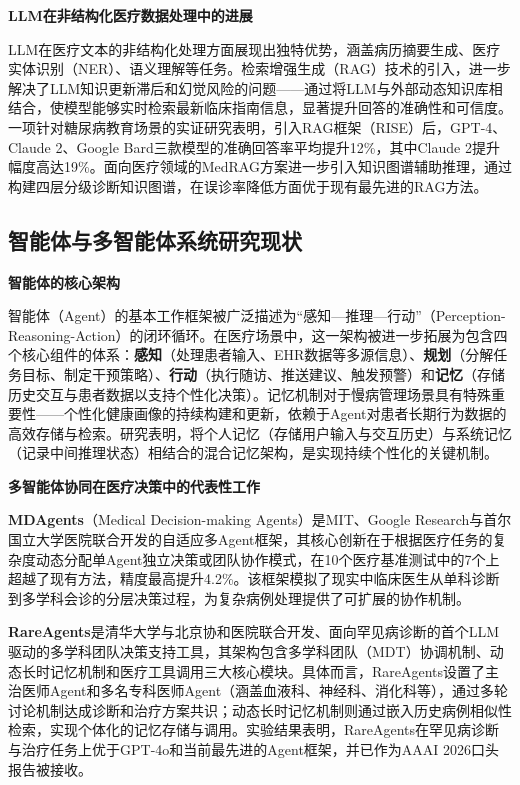 \noindent\textbf{LLM在非结构化医疗数据处理中的进展}

LLM在医疗文本的非结构化处理方面展现出独特优势，涵盖病历摘要生成、医疗实体识别（NER）、语义理解等任务。检索增强生成（RAG）技术的引入，进一步解决了LLM知识更新滞后和幻觉风险的问题------通过将LLM与外部动态知识库相结合，使模型能够实时检索最新临床指南信息，显著提升回答的准确性和可信度。一项针对糖尿病教育场景的实证研究表明，引入RAG框架（RISE）后，GPT-4、Claude 2、Google Bard三款模型的准确回答率平均提升12\%，其中Claude 2提升幅度高达19\%。面向医疗领域的MedRAG方案进一步引入知识图谱辅助推理，通过构建四层分级诊断知识图谱，在误诊率降低方面优于现有最先进的RAG方法\todocite{}\todocite{}\todocite{}。

\subsection{智能体与多智能体系统研究现状}

\noindent\textbf{智能体的核心架构}

智能体（Agent）的基本工作框架被广泛描述为``感知---推理---行动''（Perception-Reasoning-Action）的闭环循环。在医疗场景中，这一架构被进一步拓展为包含四个核心组件的体系：\textbf{感知}（处理患者输入、EHR数据等多源信息）、\textbf{规划}（分解任务目标、制定干预策略）、\textbf{行动}（执行随访、推送建议、触发预警）和\textbf{记忆}（存储历史交互与患者数据以支持个性化决策）。记忆机制对于慢病管理场景具有特殊重要性------个性化健康画像的持续构建和更新，依赖于Agent对患者长期行为数据的高效存储与检索。研究表明，将个人记忆（存储用户输入与交互历史）与系统记忆（记录中间推理状态）相结合的混合记忆架构，是实现持续个性化的关键机制\todocite{}\todocite{}\todocite{}\todocite{}。

\noindent\textbf{多智能体协同在医疗决策中的代表性工作}

\textbf{MDAgents}（Medical Decision-making Agents）是MIT、Google Research与首尔国立大学医院联合开发的自适应多Agent框架，其核心创新在于根据医疗任务的复杂度动态分配单Agent独立决策或团队协作模式，在10个医疗基准测试中的7个上超越了现有方法，精度最高提升4.2\%。该框架模拟了现实中临床医生从单科诊断到多学科会诊的分层决策过程，为复杂病例处理提供了可扩展的协作机制\todocite{}\todocite{}。

\textbf{RareAgents}是清华大学与北京协和医院联合开发、面向罕见病诊断的首个LLM驱动的多学科团队决策支持工具，其架构包含多学科团队（MDT）协调机制、动态长时记忆机制和医疗工具调用三大核心模块。具体而言，RareAgents设置了主治医师Agent和多名专科医师Agent（涵盖血液科、神经科、消化科等），通过多轮讨论机制达成诊断和治疗方案共识；动态长时记忆机制则通过嵌入历史病例相似性检索，实现个体化的记忆存储与调用。实验结果表明，RareAgents在罕见病诊断与治疗任务上优于GPT-4o和当前最先进的Agent框架，并已作为AAAI 2026口头报告被接收\todocite{}\todocite{}。

